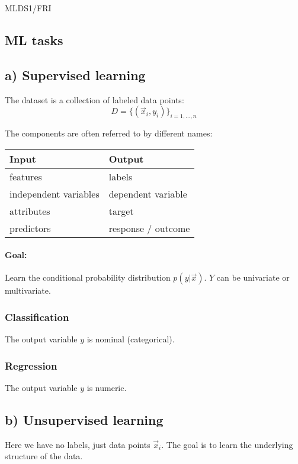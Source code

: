 \documentclass{article}
\begin{document}
\begin{center}
	{\small MLDS1/FRI \par}
\end{center}


\begin{multicols}{2}
	\section{ML tasks}

	\subsection{a) Supervised learning}
	The dataset is a collection of labeled data points:
	$$ D = \{(\vec{x}_i, y_i)\}_{i=1,...,n} $$

	The components are often referred to by different names:
	\begin{table}[h!]
		\centering
		\begin{tabular}{|l|l|}
			\hline
			\textbf{Input}        & \textbf{Output}    \\
			\hline
			features              & labels             \\
			independent variables & dependent variable \\
			attributes            & target             \\
			predictors            & response / outcome \\
			\hline
		\end{tabular}
	\end{table}

	\paragraph{Goal:} Learn the conditional probability distribution $p(y|\vec{x})$.
	$Y$ can be univariate or multivariate.

	\subsubsection{Classification}
	The output variable $y$ is nominal (categorical).

	\subsubsection{Regression}
	The output variable $y$ is numeric.

	\subsection{b) Unsupervised learning}
	Here we have no labels, just data points $\vec{x}_i$. The goal is to learn the underlying structure of the data.


\end{multicols}
\end{document}
